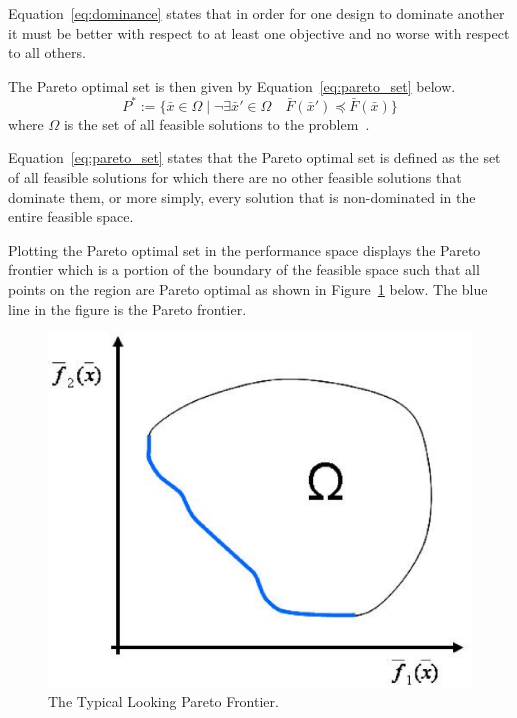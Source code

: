 Equation~\ref{eq:dominance} states that in order for one design to
dominate another it must be better with respect to at least one
objective and no worse with respect to all others.

The Pareto optimal set is then given by Equation~\ref{eq:pareto_set}
below.
\begin{equation}\label{eq:pareto_set}
    P^*:=\{\bar{x}\in\Omega\mid\neg\exists\bar{x}'\in\Omega\quad
         \bar{F}(\bar{x}')\preceq\bar{F}(\bar{x})\}
\end{equation}
\noindent where $\Omega$ is the set of all feasible solutions to the
problem~\cite{coello:eas_for_mop:2002}.

Equation~\ref{eq:pareto_set} states that the Pareto optimal set is
defined as the set of all feasible solutions for which there are no
other feasible solutions that dominate them, or more simply, every
solution that is non-dominated in the entire feasible space.

Plotting the Pareto optimal set in the performance space displays
the Pareto frontier which is a portion of the boundary of the
feasible space such that all points on the region are Pareto optimal
as shown in Figure~\ref{fig:pareto_front} below.  The blue line in
the figure is the Pareto frontier.

\begin{figure}[!ht]
    \centering
    \includegraphics[scale=0.45]{../../images/pareto_front.eps}
    \caption{The Typical Looking Pareto Frontier.}
    \label{fig:pareto_front}
\end{figure}

